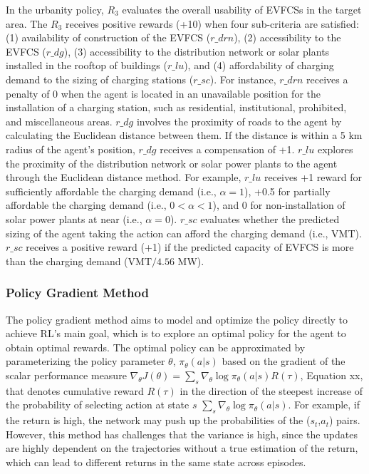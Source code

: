 \documentclass[preprint,12pt]{elsarticle}
\begin{document}
In the urbanity policy, $R_3$ evaluates the overall usability of EVFCSs in the target area. The $R_3$ receives positive rewards (+10) when four sub-criteria are satisfied: (1) availability of construction of the EVFCS ($r\_drn$), (2) accessibility to the EVFCS ($r\_dg$), (3) accessibility to the distribution network or solar plants installed in the rooftop of buildings ($r\_lu$), and (4) affordability of charging demand to the sizing of charging stations ($r\_sc$). For instance, $r\_drn$ receives a penalty of 0 when the agent is located in an unavailable position for the installation of a charging station, such as residential, institutional, prohibited, and miscellaneous areas. $r\_dg$ involves the proximity of roads to the agent by calculating the Euclidean distance between them. If the distance is within a 5 km radius of the agent's position, $r\_dg$ receives a compensation of +1. $r\_lu$ explores the proximity of the distribution network or solar power plants to the agent through the Euclidean distance method. For example, $r\_lu$ receives +1 reward for sufficiently affordable the charging demand (i.e., $\alpha = 1$), +0.5 for partially affordable the charging demand (i.e., $0<\alpha<1$), and 0 for non-installation of solar power plants at near (i.e., $\alpha=0$). $r\_sc$ evaluates whether the predicted sizing of the agent taking the action can afford the charging demand (i.e., VMT). $r\_sc$ receives a positive reward (+1) if the predicted capacity of EVFCS is more than the charging demand ($\mathrm{VMT}/4.56$ MW). 

\subsubsection{Policy Gradient Method}
The policy gradient method aims to model and optimize the policy directly to achieve RL's main goal, which is to explore an optimal policy for the agent to obtain optimal rewards. The optimal policy can be approximated by parameterizing the policy parameter $\theta$, $\pi_\theta(a|s)$ based on the gradient of the scalar performance measure $\nabla _{\theta}J(\theta)= \sum_{s}^{}\nabla_\theta\log\pi_\theta(a|s)R(\tau)$, Equation xx, that denotes cumulative reward $R(\tau)$ in the direction of the steepest increase of the probability of selecting action at state $s$ $\sum_{s}^{}\nabla_\theta\log\pi_\theta(a|s)$. For example, if the return is high, the network may push up the probabilities of the ($s_t$,$a_t$) pairs. However, this method has challenges that the variance is high, since the updates are highly dependent on the trajectories without a true estimation of the return, which can lead to different returns in the same state across episodes. 
\end{document}

